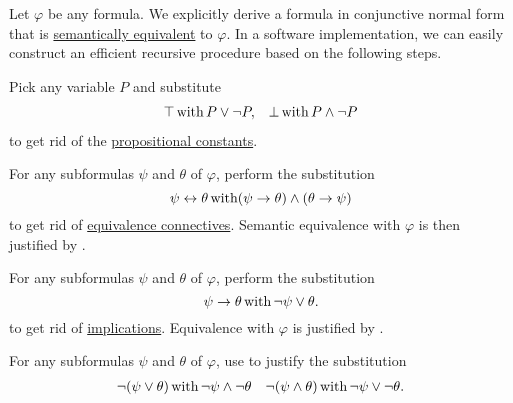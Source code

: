 \begin{algorithm}\label{alg:conjunctive_normal_form_reduction}
  Let \( \varphi \) be any formula. We explicitly derive a formula in conjunctive normal form that is \hyperref[def:propositional_semantics/equivalence]{semantically equivalent} to \( \varphi \). In a software implementation, we can easily construct an efficient recursive procedure based on the following steps.

  \begin{algenum}
     Pick any variable \( P \) and substitute
    \begin{align*}
      \top \mathop{\text{with}} P \vee \neg P, && \bot \mathop{\text{with}} P \wedge \neg P
    \end{align*}
    to get rid of the \hyperref[def:propositional_language/constants]{propositional constants}.

     For any subformulas \( \psi \) and \( \theta \) of \( \varphi \), perform the substitution
    \begin{equation*}
      \psi \leftrightarrow \theta \mathop{\text{with}} (\psi \to \theta) \wedge (\theta \to \psi)
    \end{equation*}
    to get rid of \hyperref[def:propositional_language/connectives/equivalence]{equivalence connectives}. Semantic equivalence with \( \varphi \) is then justified by .

     For any subformulas \( \psi \) and \( \theta \) of \( \varphi \), perform the substitution
    \begin{equation*}
      \psi \to \theta \mathop{\text{with}} \neg \psi \vee \theta.
    \end{equation*}
    to get rid of \hyperref[def:propositional_language/connectives/implication]{implications}. Equivalence with \( \varphi \) is justified by .

     For any subformulas \( \psi \) and \( \theta \) of \( \varphi \), use  to justify the substitution
    \begin{align*}
      \neg(\psi \vee \theta) \mathop{\text{with}} \neg \psi \wedge \neg \theta
      &&
      \neg(\psi \wedge \theta) \mathop{\text{with}} \neg \psi \vee \neg \theta.
    \end{align*}


\end{algenum}
\end{algorithm}
